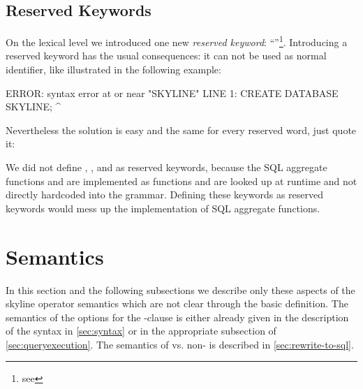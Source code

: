 \subsection{Reserved Keywords}
\label{sec:reservedkeywords}
On the lexical level we introduced one new \emph{reserved
keyword}: ``''\footnote{see
}. Introducing a reserved
keyword has the usual consequences: it can not be used as normal
identifier, like illustrated in the following example:

\begin{interactive}
ERROR:  syntax error at or near "SKYLINE"
LINE 1: CREATE DATABASE SKYLINE;
                        ^
\end{interactive}
\noindent
Nevertheless the solution is easy and the same for every reserved
word, just quote it:
\begin{interactive}
\end{interactive}

We did not define , , and
 as reserved keywords, because the SQL aggregate
functions  and  are implemented as
functions and are looked up at runtime and not directly hardcoded into
the grammar. Defining these keywords as reserved keywords would mess
up the implementation of SQL aggregate functions.

\section{Semantics}

In this section and the following subsections we describe only these
aspects of the skyline operator semantics which are not clear through
the basic definition.  The semantics of the options for the
-clause is either already given in the description
of the syntax in \autoref{sec:syntax} or in the appropriate subsection
of \autoref{sec:queryexecution}.
The semantics of 
vs. non- is described in
\autoref{sec:rewrite-to-sql}.


